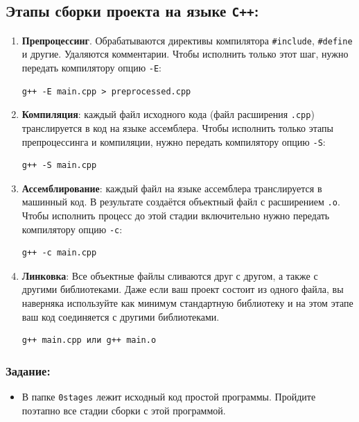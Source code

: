 \documentclass{article}
\begin{document}
\subsection*{Этапы сборки проекта на языке \texttt{C++}:}
\begin{enumerate}
\item \textbf{Препроцессинг}. Обрабатываются директивы компилятора \texttt{\#include}, \texttt{\#define} и другие. Удаляются комментарии. Чтобы исполнить только этот шаг, нужно передать компилятору опцию \texttt{-E}:
\begin{verbatim}
g++ -E main.cpp > preprocessed.cpp
\end{verbatim}
\item \textbf{Компиляция}: каждый файл исходного кода (файл расширения \texttt{.cpp}) транслируется в код на языке ассемблера. Чтобы исполнить только этапы препроцессинга и компиляции, нужно передать компилятору опцию \texttt{-S}:
\begin{verbatim}
g++ -S main.cpp
\end{verbatim}
\item \textbf{Ассемблирование}: каждый файл на языке ассемблера транслируется в машинный код. В результате создаётся объектный файл с расширением \texttt{.o}. Чтобы исполнить процесс до этой стадии включительно нужно передать компилятору опцию \texttt{-c}:
\begin{verbatim}
g++ -c main.cpp
\end{verbatim}
\item \textbf{Линковка}: Все объектные файлы сливаются друг с другом, а также с другими библиотеками. Даже если ваш проект состоит из одного файла, вы наверняка используйте как минимум стандартную библиотеку и на этом этапе ваш код соединяется с другими библиотеками.
\begin{verbatim}
g++ main.cpp или g++ main.o
\end{verbatim}
\end{enumerate}


\subsubsection*{Задание:}
\begin{itemize}
\item В папке \texttt{0stages} лежит исходный код простой программы. Пройдите поэтапно все стадии сборки с этой программой.
\end{itemize}
\end{document}
